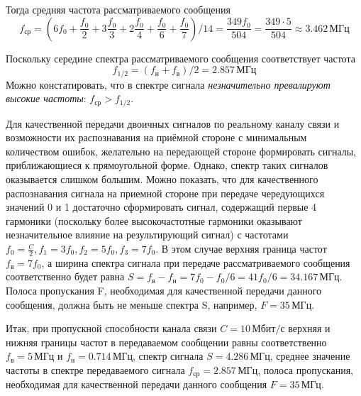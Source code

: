 Тогда средняя частота рассматриваемого сообщения
\[
	f_{\text{ср}} = \left(6f_0+\frac{f_0}{2}+3\frac{f_0}{3}+2\frac{f_0}{4}+\frac{f_0}{6}+\frac{f_0}{7}\right)/ 14 = \frac{349f_0}{504} = \frac{349 \cdot 5}{504} \approx 3.462 \, \text{МГц}
\]

Поскольку середине спектра рассматриваемого сообщения соответствует частота
\[
	f_{1/2} = (f_{\text{н}} + f_{\text{в}}) /2 = 2.857 \, \text{МГц}
\]
Можно констатировать, что в спектре сигнала \textit{незначительно превалируют высокие частоты}: $f_{\text{ср}} > f_{1/2}$.

Для качественной передачи двоичных сигналов по реальному каналу связи и возможности их распознавания на приёмной стороне с минимальным количеством ошибок, желательно на передающей стороне формировать сигналы, приближающиеся к прямоугольной форме. Однако, спектр таких сигналов оказывается слишком большим. Можно показать, что для качественного распознавания сигнала на приемной стороне при передаче чередующихся значений 0 и 1 достаточно сформировать сигнал, содержащий первые 4 гармоники (поскольку более высокочастотные гармоники оказывают незначительное влияние на результирующий сигнал) с частотами $f_0=\frac{C}{2}, f_1=3f_0, f_2=5f_0, f_3=7f_0$. В этом случае верхняя граница частот $f_{\text{в}}=7f_0$, а ширина спектра сигнала при передаче рассматриваемого сообщения соответственно будет равна $S = f_{\text{в}} - f_{\text{н}} = 7f_0-f_0/6=41f_0/6=34.167 \, \text{МГц}$. Полоса пропускания F, необходимая для качественной передачи данного сообщения, должна быть не меньше спектра S, например, $F = 35 \, \text{МГц}$.

Итак, при пропускной способности канала связи $C = 10 \, \text{Мбит/с}$ верхняя и нижняя границы частот в передаваемом сообщении равны соответственно $f_{\text{в}} = 5 \, \text{МГц}$ и $f_{\text{н}} = 0.714 \, \text{МГц}$, спектр сигнала $S = 4.286 \, \text{МГц}$, среднее значение частоты в спектре передаваемого сигнала $f_{\text{ср}} = 2.857 \, \text{МГц}$, полоса пропускания, необходимая для качественной передачи данного сообщения $F=35 \, \text{МГц}$.
